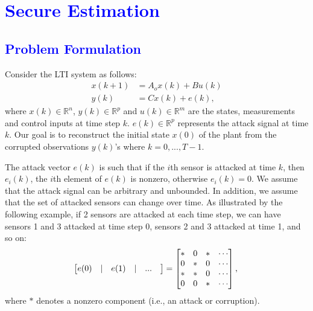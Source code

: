 \documentclass[12pt, conference, a4paper, twoside]{IEEEconf_mod}
\begin{document}
\vspace{3mm}
\section{\textcolor{blue}{Secure Estimation}}


\subsection{\textcolor{blue}{Problem Formulation}}
Consider the LTI system as follows:
\begin{equation}
\begin{aligned}
x(k+1) &= A_o x(k) + B u(k) \\
y(k) &= C x(k) + e(k),
\end{aligned} 
\label{eq:system_model_se}
\end{equation} 
where $x(k) \in \mathbb{R}^n$, $y(k) \in \mathbb{R}^p$ and $u(k) \in \mathbb{R}^m$ are the states, measurements and control inputs at time step $k$. $e(k) \in \mathbb{R}^p$ represents the attack signal at time $k$. Our goal is to reconstruct the initial state $x(0)$ of the plant from the corrupted observations $y(k)$'s where $k=0,...,T-1$.

The attack vector $e(k)$ is such that if the $i$th sensor is attacked at time $k$, then $e_i(k)$, the $i$th element of $e(k)$ is nonzero, otherwise $e_i(k) = 0$. We assume that the attack signal can be arbitrary and unbounded. In addition, we assume that the set of attacked sensors can change over time. As illustrated by the following example, if 2 sensors are attacked at each time step, we can have sensors 1 and 3 attacked at time step 0, sensors 2 and 3 attacked at time 1, and so on:
\begin{equation}
	\begin{bmatrix} e(0)  & \lvert & e(1) & \lvert &  ...  & \end{bmatrix} 
	= \begin{bmatrix} * & 0 & * & \cdots \\
					       0 & * & 0 & \cdots \\
					       * & * & 0 & \cdots \\
					       0 & 0 & * &\cdots 
			\end{bmatrix}, \nonumber \\
\end{equation}
where $*$ denotes a nonzero component (i.e., an attack or corruption). 
\end{document}
